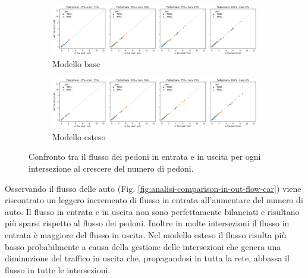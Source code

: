 \begin{figure}[ht]
    \centering
    \begin{subfigure}{\textwidth}
        \centering
        \includegraphics[width=\textwidth]{images/analisi/comparison-base-in-out-flow-ped.png}
        \caption{Modello base}
    \end{subfigure}

    \begin{subfigure}{\textwidth}
        \centering
        \includegraphics[width=\textwidth]{images/analisi/comparison-new-in-out-flow-ped.png}
        \caption{Modello esteso}
    \end{subfigure}
    \caption{
        Confronto tra il flusso dei pedoni in entrata e in uscita per ogni intersezione al crescere del numero di pedoni.
    }
    \label{fig:analisi-comparison-in-out-flow-ped}
\end{figure}

Osservando il flusso delle auto (Fig. \ref{fig:analisi-comparison-in-out-flow-car})
viene riscontrato un leggero incremento di flusso in entrata all'aumentare del numero di auto.
Il flusso in entrata e in uscita non sono perfettamente bilanciati e risultano più sparsi rispetto al flusso dei pedoni.
Inoltre in molte intersezioni il flusso in entrata è maggiore del flusso in uscita.
%
Nel modello esteso il flusso risulta più basso
probabilmente a causa della gestione delle intersezioni che genera una diminuzione del traffico in uscita che,
propagandosi in tutta la rete, abbassa il flusso in tutte le intersezioni.

